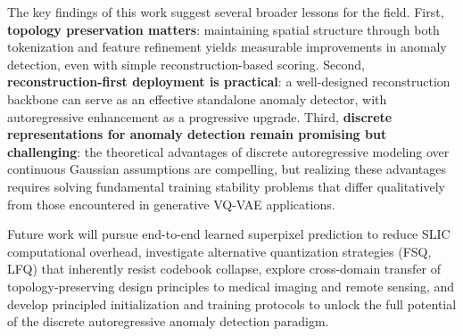 \documentclass[lettersize,journal]{IEEEtran}
\begin{document}
The key findings of this work suggest several broader lessons for the field. First, \textbf{topology preservation matters}: maintaining spatial structure through both tokenization and feature refinement yields measurable improvements in anomaly detection, even with simple reconstruction-based scoring. Second, \textbf{reconstruction-first deployment is practical}: a well-designed reconstruction backbone can serve as an effective standalone anomaly detector, with autoregressive enhancement as a progressive upgrade. Third, \textbf{discrete representations for anomaly detection remain promising but challenging}: the theoretical advantages of discrete autoregressive modeling over continuous Gaussian assumptions are compelling, but realizing these advantages requires solving fundamental training stability problems that differ qualitatively from those encountered in generative VQ-VAE applications.

Future work will pursue end-to-end learned superpixel prediction to reduce SLIC computational overhead, investigate alternative quantization strategies (FSQ, LFQ) that inherently resist codebook collapse, explore cross-domain transfer of topology-preserving design principles to medical imaging and remote sensing, and develop principled initialization and training protocols to unlock the full potential of the discrete autoregressive anomaly detection paradigm.
\end{document}
